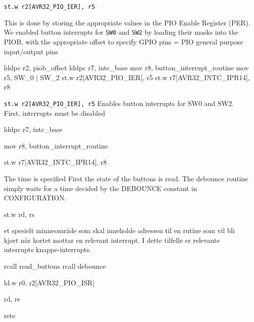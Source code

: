 \texttt{st.w r2[AVR32_PIO_IER], r5 }

This is done by storing the appropriate values in the PIO Enable Register (PER).
We enabled button interrupts for \texttt{SW0} and \texttt{SW2} by loading their masks into the PIOB, with the appropriate offset to specify
GPIO pins = PIO
general purpose input/output pins

lddpc r2, piob_offset
lddpc r7, intc_base
mov r8, button_interrupt_routine
mov r5, SW_0 | SW_2
st.w r2[AVR32_PIO_IER], r5 
st.w r7[AVR32_INTC_IPR14], r8

\texttt{st.w r2[AVR32_PIO_IER], r5}
Enables button interrupts for SW0 and SW2.
First, interrupts must be disabled


lddpc r7, intc_base

mov r8, button_interrupt_routine

st.w r7[AVR32_INTC_IPR14], r8

The time is specified 
First the state of the buttons is read.
The debounce routine simply waits for a time decided by the DEBOUNCE constant in CONFIGURATION.

st.w rd, rs


et spesielt minneområde som skal inneholde adressen til en rutine som vil bli kjørt når kortet mottar en relevant interrupt. I dette tilfelle er relevante interrupts knappe-interrupts.

rcall read_buttons
rcall debounce

ld.w r0, r2[AVR32_PIO_ISR]

rd, rs

rete
